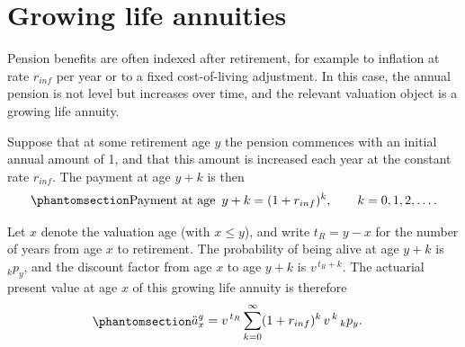 \documentclass[
  letterpaper,
  DIV=11,
  numbers=noendperiod]{scrreprt}
\begin{document}
\section*{Growing life annuities}\label{growing-life-annuities}


Pension benefits are often indexed after retirement, for example to
inflation at rate \(r_{inf}\) per year or to a fixed cost-of-living
adjustment. In this case, the annual pension is not level but increases
over time, and the relevant valuation object is a growing life annuity.

Suppose that at some retirement age \(y\) the pension commences with an
initial annual amount of 1, and that this amount is increased each year
at the constant rate \(r_{inf}\). The payment at age \(y + k\) is then
\begin{equation}\protect\phantomsection\label{eq-gen-0014}{ 
\begin{align}
    \text{Payment at age } \, y + k = (1 + r_{inf})^{k}, \qquad k = 0,1,2,\dots.
\end{align}
}\end{equation}

Let \(x\) denote the valuation age (with \(x \le y\)), and write
\(t_R = y - x\) for the number of years from age \(x\) to retirement.
The probability of being alive at age \(y + k\) is \({}_k p_y\), and the
discount factor from age \(x\) to age \(y + k\) is \(v^{\,t_R + k}\).
The actuarial present value at age \(x\) of this growing life annuity is
therefore
\begin{equation}\protect\phantomsection\label{eq-growing-life-annuity-factor}{  
\begin{align}
    \ddot{a}_x^{g} &= v^{\,t_R} \sum_{k=0}^{\infty} (1 + r_{inf})^{k} \, v^{\,k} \, {}_k p_y.
\end{align}
}\end{equation}
\end{document}
